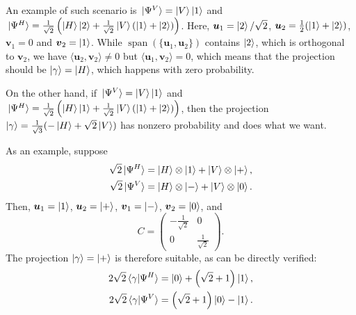 \documentclass[
	aps, pra, authorblock, superscriptaddress, twocolumn,
	10pt
]{revtex4-1}
\newcommand{\bs}[1]{\boldsymbol{#1}}
\newcommand{\on}[1]{\operatorname{#1}}
\begin{document}
An example of such scenario is
$\ket*{\Psi^V}=\ket V\ket1$ and
$\ket*{\Psi^H}=\frac{1}{\sqrt2}\left(\ket H\ket2 + \frac{1}{\sqrt2}\ket V(\ket{1} + \ket2)\right)$.
Here, $\bs u_1 = \ket2/\sqrt2$, $\bs u_2=\frac12(\ket1+\ket2)$,
$\bs v_1=0$ and $\bs v_2=\ket1$.
While $\on{span}(\{\bs u_1,\bs u_2\})$ contains $\ket2$, which is orthogonal to $\bs v_2$, we have $\langle \bs u_2,\bs v_2\rangle\neq0$ but $\langle \bs u_1,\bs v_2\rangle=0$, which means that the projection should be $\ket\gamma=\ket H$, which happens with zero probability.

On the other hand, if
$\ket*{\Psi^V}=\ket V\ket1$ and
$\ket*{\Psi^H}=\frac{1}{\sqrt2}\left(\ket H\ket1 + \frac{1}{\sqrt2}\ket V(\ket{1} + \ket2)\right)$,
then the projection $\ket\gamma=\frac{1}{\sqrt3}(-\ket H+ \sqrt2\ket V)$ has nonzero probability and does what we want. 

As an example, suppose
\begin{equation}
\begin{aligned}
    \sqrt2\ket*{\Psi^H} &= \ket H\otimes \ket 1 + \ket V\otimes \ket +, \\
    \sqrt2\ket*{\Psi^V} &= \ket H\otimes \ket - + \ket V\otimes \ket 0.
\end{aligned}
\end{equation}
Then,
$\bs u_1 = \ket 1$, $\bs u_2 = \ket +$,
$\bs v_1 = \ket -$, $\bs v_2 = \ket 0$,
and
\begin{equation}
    C = \begin{pmatrix}
        -\frac1{\sqrt2} & 0 \\
        0 & \frac1{\sqrt2}
    \end{pmatrix}.
\end{equation}
The projection $\ket\gamma=\ket+$ is therefore suitable, as can be directly verified:
\begin{equation}
\begin{aligned}
    2\sqrt2 \braket*{\gamma}{\Psi^H} &=
    \ket0 +
    \left(\sqrt2 + 1\right) \ket1, \\
    2\sqrt2 \braket*{\gamma}{\Psi^V} &=
    \left(\sqrt2 + 1\right) \ket0
    - \ket1.
\end{aligned}
\end{equation}
\end{document}
